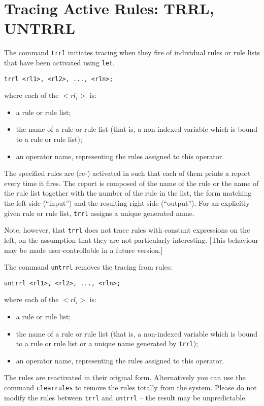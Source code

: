 \section{Tracing Active Rules: TRRL, UNTRRL}

\hypertarget{command:TRRL}{}
\hypertarget{command:UNTRRL}{}
The command \texttt{trrl} initiates tracing when they fire of
individual rules or rule lists that have been activated using
\texttt{let}.
\begin{verbatim}
trrl <rl1>, <rl2>, ..., <rln>;
\end{verbatim}
where each of the $<rl_i>$ is:
\begin{itemize}
\item a rule or rule list;
\item the name of a rule or rule list (that is, a non-indexed variable
      which is bound to a rule or rule list);
\item an operator name, representing the rules assigned to this
      operator.
\end{itemize}
The specified rules are (re-) activated in \REDUCE{} such that each of
them prints a report every time it fires.  The report is composed of
the name of the rule or the name of the rule list together with the
number of the rule in the list, the form matching the left side
(``input'') and the resulting right side (``output'').  For an
explicitly given rule or rule list, \texttt{trrl} assigns a unique
generated name.

Note, however, that \texttt{trrl} does not trace rules with constant
expressions on the left, on the assumption that they are not
particularly interesting.  [This behaviour may be made
user-controllable in a future version.]

The command \texttt{untrrl} removes the tracing from rules:
\begin{verbatim}
untrrl <rl1>, <rl2>, ..., <rln>;
\end{verbatim}
where each of the $<rl_i>$ is:
\begin{itemize}
\item a rule or rule list;
\item the name of a rule or rule list (that is, a non-indexed variable
which is bound to a rule or rule list or a unique name generated by
\texttt{trrl});
\item an operator name, representing the rules assigned to this
operator.
\end{itemize}
The rules are reactivated in their original form.  Alternatively you
can use the command \texttt{clearrules} to remove the rules totally
from the system.  Please do not modify the rules between \texttt{trrl}
and \texttt{untrrl} -- the result may be unpredictable.

